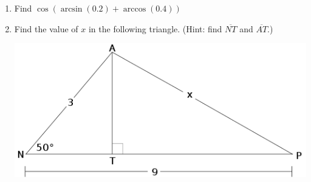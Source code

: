 \documentclass{article}
\begin{document}
\begin{enumerate}
  \vspace{2in}
\item Find $\cos(\arcsin(0.2) + \arccos(0.4))$
  \vspace{2in}
\item Find the value of $x$ in the following triangle. (Hint: find $\overline{NT}$ and $\overline{AT}$.)
  \begin{center}
    \includegraphics[scale=0.5]{triangle_trig.png}
  \end{center}
\end{enumerate}
\end{document}
